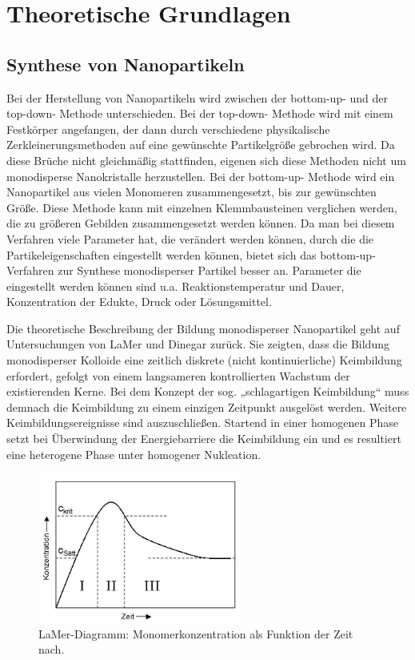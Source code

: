 \section{Theoretische Grundlagen}
\subsection{Synthese von Nanopartikeln}
	Bei der Herstellung von Nanopartikeln wird zwischen der \glqq bottom-up\grqq - und der \glqq top-down\grqq - Methode unterschieden.
	Bei der \glqq top-down\grqq - Methode wird mit einem Festkörper angefangen, der dann durch verschiedene physikalische Zerkleinerungsmethoden auf eine gewünschte Partikelgröße gebrochen wird.
	Da diese Brüche nicht gleichmäßig stattfinden, eigenen sich diese Methoden nicht um monodisperse Nanokristalle herzustellen.
	Bei der \glqq bottom-up\grqq - Methode wird ein Nanopartikel aus vielen Monomeren zusammengesetzt, bis zur gewünschten Größe.
	Diese Methode kann mit einzelnen Klemmbausteinen verglichen werden, die zu größeren Gebilden zusammengesetzt werden können.
	Da man bei diesem Verfahren viele Parameter hat, die verändert werden können, durch die die Partikeleigenschaften eingestellt werden können, bietet sich das \glqq bottom-up\grqq - Verfahren zur Synthese monodisperser Partikel besser an.
	Parameter die eingestellt werden können sind u.a. Reaktionstemperatur und Dauer, Konzentration der Edukte, Druck oder Lösungsmittel.
	
	Die theoretische Beschreibung der Bildung monodisperser Nanopartikel geht auf Untersuchungen von LaMer und Dinegar zurück.\autocite{Lamer1950}
	Sie zeigten, dass die Bildung
	monodisperser Kolloide eine zeitlich diskrete (nicht kontinuierliche) Keimbildung
	erfordert, gefolgt von einem langsameren kontrollierten Wachstum der existierenden
	Kerne.
	Bei dem Konzept der sog. „schlagartigen Keimbildung“ muss demnach die
	Keimbildung zu einem einzigen Zeitpunkt ausgelöst werden. Weitere
	Keimbildungsereignisse sind auszuschließen. Startend in einer homogenen Phase setzt
	bei Überwindung der Energiebarriere die Keimbildung ein und es resultiert eine
	heterogene Phase unter homogener Nukleation. \autocite{Park2007}
	
	\begin{figure}[H]
		\centering
		\includegraphics[width=0.6\textwidth]{Bilder/LaMer} 	
		\caption{LaMer-Diagramm: Monomerkonzentration als Funktion der Zeit nach.\autocite{Lamer1950}}
		\label{fig:LaMer}
	\end{figure}


